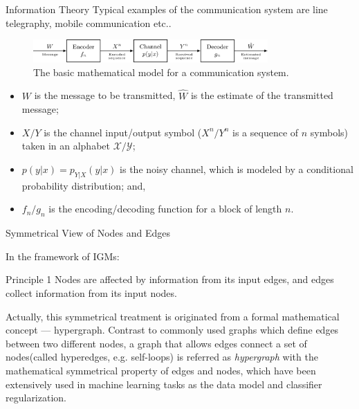 \documentclass[10pt]{beamer}
\begin{document}
\begin{CJK*}{UTF8}{gbsn}
\begin{frame}{Information Theory}
Typical examples of the communication system are line telegraphy, mobile communication etc..
    \begin{figure}
        \centering
        \includegraphics[width=0.8\textwidth]{latex/image/channel.png}
        \caption{The basic mathematical model for a communication system.}
        \label{fig:channel}
    \end{figure}
    
\begin{itemize}
    \item $W$ is the message to be transmitted, ${\hat  {W}}$ is the estimate of the transmitted message;
    \item $X/Y$ is the channel input/output symbol ($X^{n}/Y^{n}$ is a sequence of $n$ symbols) taken in an alphabet ${\mathcal {X}}/{\mathcal {Y}}$;
    \item ${\displaystyle p(y|x)=p_{Y|X}(y|x)}$ is the noisy channel, which is modeled by a conditional probability distribution; and,
    \item  $f_{n}/g_{n}$ is the encoding/decoding function for a block of length $n$.
\end{itemize}







    
\end{frame}

\begin{frame}{Symmetrical View of Nodes and Edges}
    
    In the framework of IGMs: 
    \begin{block}{Principle 1}
    \label{prin:sym}
     Nodes are affected by information from its input edges, and edges collect information from its input nodes.
    \end{block}
    
    Actually, this symmetrical treatment is originated from a formal mathematical concept --- hypergraph. Contrast to commonly used graphs which define edges between two different nodes, a graph that allows edges connect a set of nodes(called hyperedges, e.g. self-loops) is referred as \emph{hypergraph} with the mathematical symmetrical property of edges and nodes, which have been extensively used in machine learning tasks as the data model and classifier regularization\cite{zhou2007learning}.    
\end{frame}



\end{CJK*}
\end{document}

